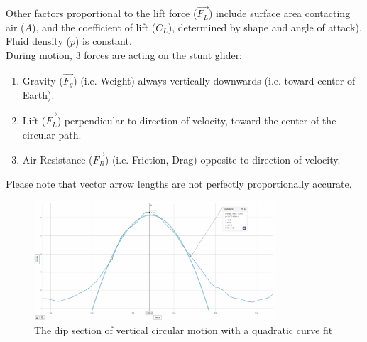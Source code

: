 \documentclass[11pt, a4paper]{article}
\def\ParagraphSpacing{30pt}
\begin{document}
	Other factors proportional to the lift force ($\vec{F_L}$) include surface area contacting air ($A$), and the coefficient of lift ($C_L$), determined by shape and angle of attack).\\
	Fluid density ($p$) is constant.\\[\ParagraphSpacing]
	During motion, 3 forces are acting on the stunt glider:
	\begin{enumerate}
		\item Gravity ($\vec{F_g}$) (i.e. Weight) always vertically downwards (i.e. toward center of Earth).
		\item Lift ($\vec{F_L}$) perpendicular to direction of velocity, toward the center of the circular path.
		\item Air Resistance ($\vec{F_R}$) (i.e. Friction, Drag) opposite to direction of velocity.
	\end{enumerate}
	Please note that vector arrow lengths are not perfectly proportionally accurate.
	\begin{center}
	\end{center}
	\begin{figure}[H]
		\centering
		\includegraphics[width=0.8\textwidth]{Images/Dip in vertical circle.png}
		\caption{The dip section of vertical circular motion with a quadratic curve fit}
	\end{figure}
\end{document}
